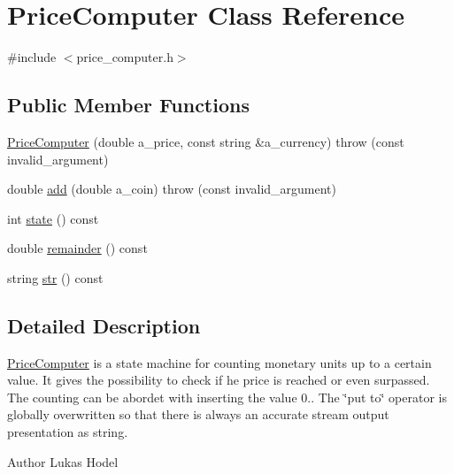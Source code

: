 \hypertarget{classPriceComputer}{\section{Price\-Computer Class Reference}
\label{classPriceComputer}
}


{\ttfamily \#include $<$price\-\_\-computer.\-h$>$}

\subsection*{Public Member Functions}
\begin{DoxyCompactItemize}
\item 
\hyperlink{classPriceComputer_a38464d6ef79b8bd72b214388a3a12590}{Price\-Computer} (double a\-\_\-price, const string \&a\-\_\-currency)  throw (const invalid\-\_\-argument)
\item 
double \hyperlink{classPriceComputer_a5432eb25a9dc564e26d28f8c992edc54}{add} (double a\-\_\-coin)  throw (const invalid\-\_\-argument)
\item 
int \hyperlink{classPriceComputer_acd1ed2559f6c99b66877dc176a7f067b}{state} () const 
\item 
double \hyperlink{classPriceComputer_aaafb5acfbdb3419e873d30ff7c544a9e}{remainder} () const 
\item 
string \hyperlink{classPriceComputer_ac6a85d7316a174de19a4eccdffd91ae3}{str} () const 
\end{DoxyCompactItemize}


\subsection{Detailed Description}
\hyperlink{classPriceComputer}{Price\-Computer} is a state machine for counting monetary units up to a certain value. It gives the possibility to check if he price is reached or even surpassed. The counting can be abordet with inserting the value 0.. The \char`\"{}put to\char`\"{} operator is globally overwritten so that there is always an accurate stream output presentation as string.

\begin{DoxyAuthor}{Author}
Lukas Hodel 
\end{DoxyAuthor}


